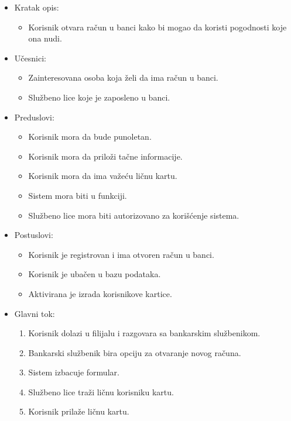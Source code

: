 \documentclass{article}
\begin{document}
\begin{itemize}
    \item Kratak opis:
        \begin{itemize}
            \item Korisnik otvara račun u banci kako bi mogao da koristi pogodnosti koje ona nudi.
        \end{itemize}
    \item Učesnici:
        \begin{itemize}
            \item Zainteresovana osoba koja želi da ima račun u banci.
            \item Službeno lice koje je zaposleno u banci.
        \end{itemize}
    \item Preduslovi:
        \begin{itemize}
            \item Korisnik mora da bude punoletan.
            \item Korisnik mora da priloži tačne informacije.
            \item Korisnik mora da ima važeću ličnu kartu.
            \item Sistem mora biti u funkciji.
            \item Službeno lice mora biti autorizovano za korišćenje sistema.
        \end{itemize}
    \item Postuslovi:
        \begin{itemize}
            \item Korisnik je registrovan i ima otvoren račun u banci.
            \item Korisnik je ubačen u bazu podataka.
            \item Aktivirana je izrada korisnikove kartice.
        \end{itemize}
    \item Glavni tok:
        \begin{enumerate}
            \item Korisnik dolazi u filijalu i razgovara sa bankarskim službenikom.
            \item Bankarski službenik bira opciju za otvaranje novog računa.
            \item Sistem izbacuje formular.
            \item Službeno lice traži ličnu korisniku kartu.
            \item Korisnik prilaže ličnu kartu.

\end{enumerate}
\end{itemize}
\end{document}
